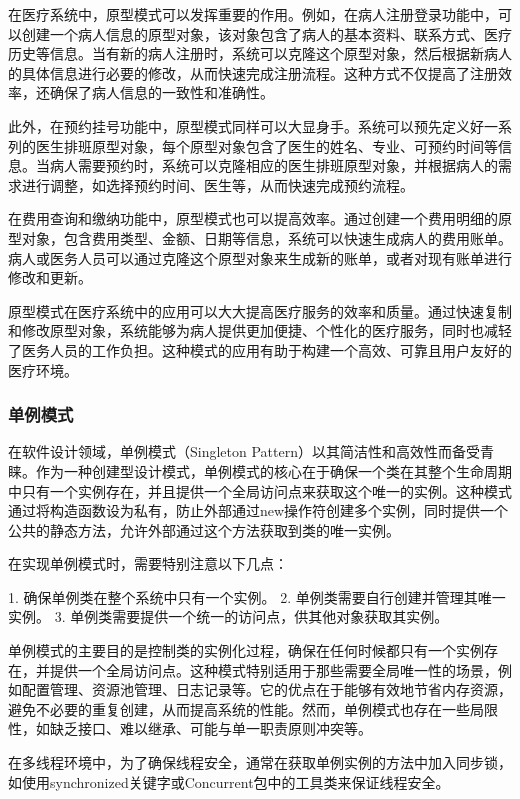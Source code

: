 在医疗系统中，原型模式可以发挥重要的作用。例如，在病人注册登录功能中，可以创建一个病人信息的原型对象，该对象包含了病人的基本资料、联系方式、医疗历史等信息。当有新的病人注册时，系统可以克隆这个原型对象，然后根据新病人的具体信息进行必要的修改，从而快速完成注册流程。这种方式不仅提高了注册效率，还确保了病人信息的一致性和准确性。

此外，在预约挂号功能中，原型模式同样可以大显身手。系统可以预先定义好一系列的医生排班原型对象，每个原型对象包含了医生的姓名、专业、可预约时间等信息。当病人需要预约时，系统可以克隆相应的医生排班原型对象，并根据病人的需求进行调整，如选择预约时间、医生等，从而快速完成预约流程。

在费用查询和缴纳功能中，原型模式也可以提高效率。通过创建一个费用明细的原型对象，包含费用类型、金额、日期等信息，系统可以快速生成病人的费用账单。病人或医务人员可以通过克隆这个原型对象来生成新的账单，或者对现有账单进行修改和更新。


原型模式在医疗系统中的应用可以大大提高医疗服务的效率和质量。通过快速复制和修改原型对象，系统能够为病人提供更加便捷、个性化的医疗服务，同时也减轻了医务人员的工作负担。这种模式的应用有助于构建一个高效、可靠且用户友好的医疗环境。


\subsubsection{单例模式}
在软件设计领域，单例模式（Singleton Pattern）以其简洁性和高效性而备受青睐。作为一种创建型设计模式，单例模式的核心在于确保一个类在其整个生命周期中只有一个实例存在，并且提供一个全局访问点来获取这个唯一的实例。这种模式通过将构造函数设为私有，防止外部通过new操作符创建多个实例，同时提供一个公共的静态方法，允许外部通过这个方法获取到类的唯一实例。

在实现单例模式时，需要特别注意以下几点：

1. 确保单例类在整个系统中只有一个实例。
2. 单例类需要自行创建并管理其唯一实例。
3. 单例类需要提供一个统一的访问点，供其他对象获取其实例。

单例模式的主要目的是控制类的实例化过程，确保在任何时候都只有一个实例存在，并提供一个全局访问点。这种模式特别适用于那些需要全局唯一性的场景，例如配置管理、资源池管理、日志记录等。它的优点在于能够有效地节省内存资源，避免不必要的重复创建，从而提高系统的性能。然而，单例模式也存在一些局限性，如缺乏接口、难以继承、可能与单一职责原则冲突等。

在多线程环境中，为了确保线程安全，通常在获取单例实例的方法中加入同步锁，如使用synchronized关键字或Concurrent包中的工具类来保证线程安全。

